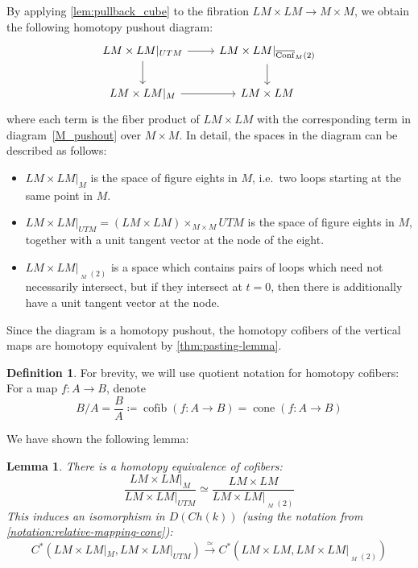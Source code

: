 \documentclass{scrartcl}
\theoremstyle{plain}
\newtheorem{lemma}[theorem]{Lemma}
\theoremstyle{definition}
\newtheorem{definition}[theorem]{Definition}
\DeclareMathOperator{\cone}{cone}
\DeclareMathOperator{\cofib}{cofib}
\newcommand{\quiso}{\simeq}
\newcommand{\defeq}{\coloneqq}
\let\xto\xrightarrow
\DeclareMathOperator{\cConf}{\overline{Conf}}
\begin{document}
\begin{enumerate}[(1)]
By applying \cref{lem:pullback_cube} to the fibration $LM\times LM\to M\times M$, we obtain the following homotopy pushout diagram:
\begin{equation}
    \begin{tikzcd}
        LM\times LM|_{UTM} \rar\dar & LM\times LM|_{\cConf_M(2)} \dar \\
        LM\times LM|_M \rar & LM\times LM
    \end{tikzcd}
\end{equation}
where each term is the fiber product of $LM\times LM$ with the corresponding term in diagram~\ref{M_pushout} over $M\times M$. In detail, the spaces in the diagram can be described as follows:
\begin{itemize}
    \item $LM\times LM|_M$ is the space of figure eights in $M$, i.e.\ two loops starting at the same point in $M$. 
    \item $LM\times LM|_{UTM} = (LM\times LM)\times_{M\times M} UTM$ is the space of figure eights in $M$, together with a unit tangent vector at the node of the eight. \item $LM\times LM|_{\cConf_M(2)}$ is a space which contains pairs of loops which need not necessarily intersect, but if they intersect at $t=0$, then there is additionally have a unit tangent vector at the node. 
\end{itemize}
Since the diagram is a homotopy pushout, the homotopy cofibers of the vertical maps are homotopy equivalent by \cref{thm:pasting-lemma}. 

\begin{definition}
    For brevity, we will use quotient notation for homotopy cofibers: For a map $f\colon A\to B$, denote
    \[
        B / A = \frac B A \defeq \cofib(f\colon A\to B) = \cone(f\colon A\to B)
    \]
\end{definition}

We have shown the following lemma:

\begin{lemma}
    There is a homotopy equivalence of cofibers:
    \[ \frac {LM\times LM|_M}{LM\times LM|_{UTM}} \quiso \frac{ LM\times LM} {LM\times LM|_{\cConf_M(2)}} \] 
    This induces an isomorphism in $D(Ch(k))$ (using the notation from \cref{notation:relative-mapping-cone}):
    \[ C^*(LM\times LM|_M, LM\times LM|_{UTM}) \xto{\quiso} C^*(LM\times LM, LM\times LM|_{\cConf_M(2)}) \]
\end{lemma}


\end{enumerate}
\end{document}
